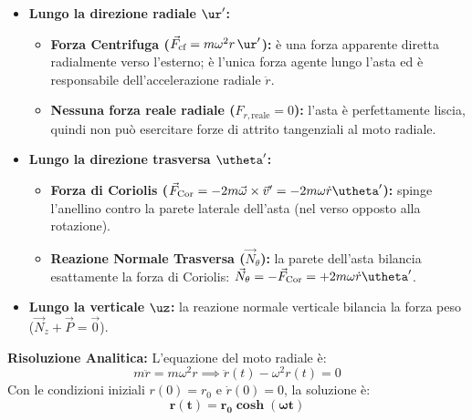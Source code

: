 \begin{tcolorbox}[enhanced, breakable, colback=forestgreen!5!white, colframe=forestgreen!80!black,
    title={\textbf{Analisi delle Forze nel Riferimento Rotante $S'$}}, fonttitle=\bfseries\sffamily]
\begin{itemize}
    \item \textbf{Lungo la direzione radiale $\ur'$:}
    \begin{itemize}
        \item \textbf{Forza Centrifuga ($\vec{F}_{\text{cf}} = m\omega^2 r\,\ur'$):} è una forza apparente diretta radialmente verso l'esterno; è l'unica forza agente lungo l'asta ed è responsabile dell'accelerazione radiale $\ddot{r}$.
        \item \textbf{Nessuna forza reale radiale ($F_{r,\text{reale}} = 0$):} l'asta è perfettamente liscia, quindi non può esercitare forze di attrito tangenziali al moto radiale.
    \end{itemize}
    \item \textbf{Lungo la direzione trasversa $\utheta'$:}
    \begin{itemize}
        \item \textbf{Forza di Coriolis ($\vec{F}_{\text{Cor}} = -2m\vec{\omega}\times\vec{v}' = -2m\omega\dot{r}\utheta'$):} spinge l'anellino contro la parete laterale dell'asta (nel verso opposto alla rotazione).
        \item \textbf{Reazione Normale Trasversa ($\vec{N}_\theta$):} la parete dell'asta bilancia esattamente la forza di Coriolis: $\vec{N}_\theta = -\vec{F}_{\text{Cor}} = +2m\omega\dot{r}\utheta'$.
    \end{itemize}
    \item \textbf{Lungo la verticale $\uz$:} la reazione normale verticale bilancia la forza peso ($\vec{N}_z + \vec{P} = \vec{0}$).
\end{itemize}
\end{tcolorbox}

\textbf{Risoluzione Analitica:}
L'equazione del moto radiale è:
\begin{equation}
    m\ddot{r} = m\omega^2 r \implies \ddot{r}(t) - \omega^2 r(t) = 0
\end{equation}
Con le condizioni iniziali $r(0) = r_0$ e $\dot{r}(0) = 0$, la soluzione è:
\begin{equation}
    \mathbf{r(t) = r_0 \cosh(\omega t)}
\end{equation}

\vspace{0.8em}

